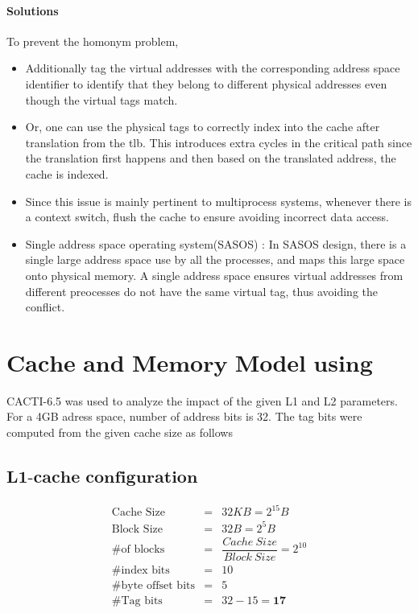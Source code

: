 \documentclass{tufte-handout}
\begin{document}
			\paragraph{Solutions} To prevent the homonym problem,
			\begin{itemize}
				\item Additionally tag the virtual addresses with the corresponding address space identifier to identify that they belong to different physical addresses even though the virtual tags match.
				\item Or, one can use the physical tags to correctly index into the cache after translation from the tlb. This introduces extra cycles in the critical path since the translation first happens and then based on the translated address, the cache is indexed.
				\item Since this issue is mainly pertinent to multiprocess systems, whenever there is a context switch, flush the cache to ensure avoiding incorrect data access.
				\item Single address space operating system(SASOS) : In SASOS design, there is a single large address space use by all the processes, and maps this large space onto physical memory. A single address space ensures virtual addresses from different preocesses do not have the same virtual tag, thus avoiding the conflict.
			\end{itemize}


\section{$\textbf{Cache and Memory Model using CACTI)}$}
	CACTI-6.5 was used to analyze the impact of the given L1 and L2 parameters. For a 4GB adress space, number of address bits is 32. The tag bits were computed from the given cache size as follows
	\subsection{$\textbf{L1-cache configuration}$}
		\begin{eqnarray*}	
			\mbox{Cache Size } &=& 32 KB = 2^{15} B \\
			\mbox{Block Size} &=& 32 B = 2^5 B \\
			\mbox{\# of blocks} &=&  \dfrac{Cache\ Size}{Block\ Size} = 2^{10} \\
			\mbox{\# index bits} &=& 10 \\ 
			\mbox{\# byte offset bits} &=& 5 \\
			\mbox{\# Tag bits} &=& 32 - 15 = \mathbf{17} \\ 
		\end{eqnarray*}
\end{document}
